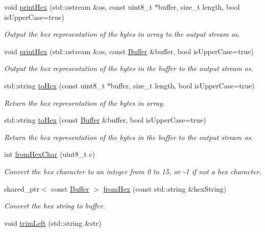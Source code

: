 \begin{DoxyCompactItemize}
\item 
void \hyperlink{namespacendn_aebe8bd727e9d77845938928a264147de}{print\+Hex} (std\+::ostream \&os, const uint8\+\_\+t $\ast$buffer, size\+\_\+t length, bool is\+Upper\+Case=true)
\begin{DoxyCompactList}\small\item\em Output the hex representation of the bytes in array to the output stream {\ttfamily os}. \end{DoxyCompactList}\item 
void \hyperlink{namespacendn_a7b06e181ebf930518fdb0201f24f97b0}{print\+Hex} (std\+::ostream \&os, const \hyperlink{classndn_1_1Buffer}{Buffer} \&buffer, bool is\+Upper\+Case=true)
\begin{DoxyCompactList}\small\item\em Output the hex representation of the bytes in the {\ttfamily buffer} to the output stream {\ttfamily os}. \end{DoxyCompactList}\item 
std\+::string \hyperlink{namespacendn_a281a6ef946bc3c5cf4d5eebe2d11ba7e}{to\+Hex} (const uint8\+\_\+t $\ast$buffer, size\+\_\+t length, bool is\+Upper\+Case=true)
\begin{DoxyCompactList}\small\item\em Return the hex representation of the bytes in array. \end{DoxyCompactList}\item 
std\+::string \hyperlink{namespacendn_ac7c1b0223b3455365fd6a714e953664b}{to\+Hex} (const \hyperlink{classndn_1_1Buffer}{Buffer} \&buffer, bool is\+Upper\+Case=true)
\begin{DoxyCompactList}\small\item\em Return the hex representation of the bytes in the {\ttfamily buffer} to the output stream {\ttfamily os}. \end{DoxyCompactList}\item 
int \hyperlink{namespacendn_a70489de556ebc3938c32f53d5efa1b89}{from\+Hex\+Char} (uint8\+\_\+t c)\hypertarget{namespacendn_a70489de556ebc3938c32f53d5efa1b89}{}\label{namespacendn_a70489de556ebc3938c32f53d5efa1b89}

\begin{DoxyCompactList}\small\item\em Convert the hex character to an integer from 0 to 15, or -\/1 if not a hex character. \end{DoxyCompactList}\item 
shared\+\_\+ptr$<$ const \hyperlink{classndn_1_1Buffer}{Buffer} $>$ \hyperlink{namespacendn_ab845744dbcf9810aa936d12bf6e1fd6b}{from\+Hex} (const std\+::string \&hex\+String)
\begin{DoxyCompactList}\small\item\em Convert the hex string to buffer. \end{DoxyCompactList}\item 
void \hyperlink{namespacendn_a40d1c7200dd6f7d0e5bb4bb28737f5b8}{trim\+Left} (std\+::string \&str)\hypertarget{namespacendn_a40d1c7200dd6f7d0e5bb4bb28737f5b8}{}\label{namespacendn_a40d1c7200dd6f7d0e5bb4bb28737f5b8}


\end{DoxyCompactItemize}
